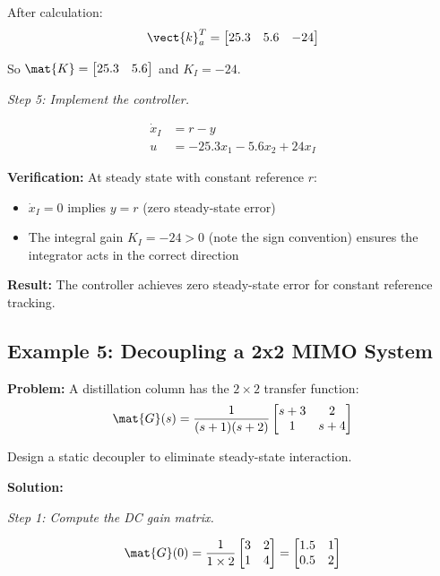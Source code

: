 After calculation:
\begin{equation}
\vect{k}_a^T = \begin{bmatrix} 25.3 & 5.6 & -24 \end{bmatrix}
\end{equation}

So $\mat{K} = \begin{bmatrix} 25.3 & 5.6 \end{bmatrix}$ and $K_I = -24$.

\textit{Step 5: Implement the controller.}

\begin{align}
\dot{x}_I &= r - y \\
u &= -25.3 x_1 - 5.6 x_2 + 24 x_I
\end{align}

\textbf{Verification:} At steady state with constant reference $r$:
\begin{itemize}
    \item $\dot{x}_I = 0$ implies $y = r$ (zero steady-state error)
    \item The integral gain $K_I = -24 > 0$ (note the sign convention) ensures the integrator acts in the correct direction
\end{itemize}

\textbf{Result:} The controller achieves zero steady-state error for constant reference tracking.

\subsection{Example 5: Decoupling a 2x2 MIMO System}

\textbf{Problem:} A distillation column has the $2 \times 2$ transfer function:
\begin{equation}
\mat{G}(s) = \frac{1}{(s+1)(s+2)}\begin{bmatrix} s+3 & 2 \\ 1 & s+4 \end{bmatrix}
\end{equation}

Design a static decoupler to eliminate steady-state interaction.

\textbf{Solution:}

\textit{Step 1: Compute the DC gain matrix.}

\begin{equation}
\mat{G}(0) = \frac{1}{1 \times 2}\begin{bmatrix} 3 & 2 \\ 1 & 4 \end{bmatrix}
= \begin{bmatrix} 1.5 & 1 \\ 0.5 & 2 \end{bmatrix}
\end{equation}

